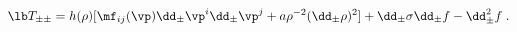 \begin{equation}
\lb T_{\pm\pm} = h(\rho)[\mf_{ij}(\vp)\dd_{\pm} \vp^i \dd_{\pm} \vp^j 
+ a \rho^{-2} (\dd_{\pm} \rho)^2] + 
\dd_{\pm} \sigma \dd_{\pm} f - \dd_{\pm}^2 f\;.
\label{constr}
\end{equation}


